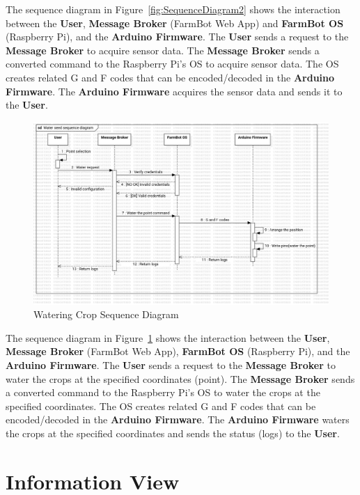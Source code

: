 The sequence diagram in Figure~\ref{fig:SequenceDiagram2} shows the interaction between the \textbf{User}, \textbf{Message Broker} (FarmBot Web App) and \textbf{FarmBot OS} (Raspberry Pi), and the \textbf{Arduino Firmware}. The \textbf{User} sends a request to the \textbf{Message Broker} to acquire sensor data. The \textbf{Message Broker} sends a converted command to the Raspberry Pi's OS to acquire sensor data. The OS creates related G and F codes that can be encoded/decoded in the \textbf{Arduino Firmware}. The \textbf{Arduino Firmware} acquires the sensor data and sends it to the \textbf{User}.

\begin{figure}[H]
    \centering
    \includegraphics[width=1\textwidth]{Figures/SequenceDiagram_watering.png}
    \caption{Watering Crop Sequence Diagram}\label{fig:SequenceDiagram3}
\end{figure}

The sequence diagram in Figure~\ref{fig:SequenceDiagram3} shows the interaction between the \textbf{User}, \textbf{Message Broker} (FarmBot Web App), \textbf{FarmBot OS} (Raspberry Pi), and the \textbf{Arduino Firmware}. The \textbf{User} sends a request to the \textbf{Message Broker} to water the crops at the specified coordinates (point). The \textbf{Message Broker} sends a converted command to the Raspberry Pi's OS to water the crops at the specified coordinates. The OS creates related G and F codes that can be encoded/decoded in the \textbf{Arduino Firmware}. The \textbf{Arduino Firmware} waters the crops at the specified coordinates and sends the status (logs) to the \textbf{User}.


\section{Information View}

